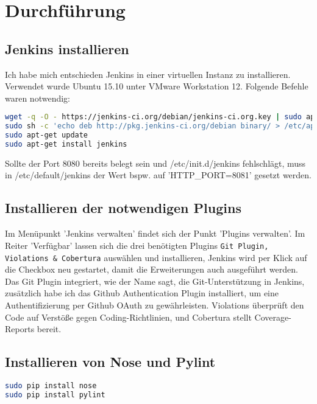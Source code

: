 \documentclass[letterpaper, 12pt]{article}
\let\tempsection\section
\renewcommand\section[1]{\vspace{-0.3cm}\tempsection{#1}\vspace{-0.3cm}}
\let\tempsubsection\subsection
\renewcommand\subsection[1]{\vspace{0cm}\tempsubsection{#1}\vspace{0cm}}
\begin{document}
\section{Durchführung}

\subsection{Jenkins installieren}
Ich habe mich entschieden Jenkins in einer virtuellen Instanz zu installieren. Verwendet wurde Ubuntu 15.10 unter VMware Workstation 12. Folgende Befehle waren notwendig: \\

\begin{lstlisting}[frame=single,language=bash, caption=Jenkins in Ubuntu installieren \cite{jenins}]
wget -q -O - https://jenkins-ci.org/debian/jenkins-ci.org.key | sudo apt-key add -
sudo sh -c 'echo deb http://pkg.jenkins-ci.org/debian binary/ > /etc/apt/sources.list.d/jenkins.list'
sudo apt-get update
sudo apt-get install jenkins
\end{lstlisting}

Sollte der Port 8080 bereits belegt sein und /etc/init.d/jenkins fehlschlägt, muss in /etc/default/jenkins der Wert bspw. auf 'HTTP\_PORT=8081' gesetzt werden.

\subsection{Installieren der notwendigen Plugins}
Im Menüpunkt 'Jenkins verwalten' findet sich der Punkt 'Plugins verwalten'. Im Reiter 'Verfügbar' lassen sich die drei benötigten Plugins \texttt{Git Plugin, Violations \& Cobertura} auswählen und installieren, Jenkins wird per Klick auf die Checkbox neu gestartet, damit die Erweiterungen auch ausgeführt werden. \\
Das Git Plugin integriert, wie der Name sagt, die Git-Unterstützung in Jenkins, zusätzlich habe ich das Github Authentication Plugin installiert, um eine Authentifizierung per Github OAuth zu gewährleisten. Violations überprüft den Code auf Verstöße gegen Coding-Richtlinien, und Cobertura stellt Coverage-Reports bereit. 

\subsection{Installieren von Nose und Pylint}

\begin{lstlisting}[frame=single,language=bash, caption=Nose und Pylint mit pip installieren]
sudo pip install nose
sudo pip install pylint
\end{lstlisting}



\clearpage



\lstlistoflistings
\listoffigures
\end{document}
